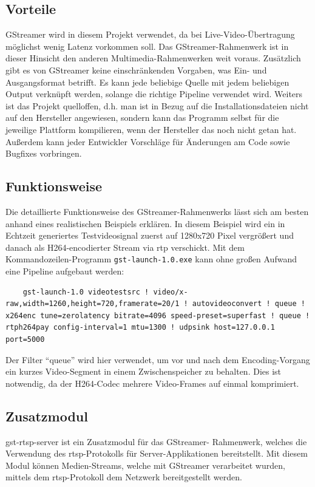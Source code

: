 \subsection{Vorteile}
GStreamer wird in diesem Projekt verwendet, da bei Live-Video-Übertragung möglichst wenig Latenz vorkommen soll.
Das GStreamer-Rahmenwerk ist in dieser Hinsicht den anderen Multimedia-Rahmenwerken weit voraus.
Zusätzlich gibt es von GStreamer keine einschränkenden Vorgaben, was Ein- und Ausgangsformat betrifft.
Es kann jede beliebige Quelle mit jedem beliebigen Output verknüpft werden, solange die richtige Pipeline verwendet wird.
Weiters ist das Projekt quelloffen, d.h. man ist in Bezug auf die Installationsdateien nicht auf den Hersteller angewiesen, sondern kann das Programm selbst für die jeweilige Plattform kompilieren, wenn der Hersteller das noch nicht getan hat.
Außerdem kann jeder Entwickler Vorschläge für Änderungen am Code sowie Bugfixes vorbringen.
\subsection{Funktionsweise}
Die detaillierte Funktionsweise des GStreamer-Rahmenwerks lässt sich am besten anhand eines realistischen Beispiels erklären.
In diesem Beispiel wird ein in Echtzeit generiertes Testvideosignal zuerst auf 1280x720 Pixel vergrößert und danach als H264-encodierter Stream via \ac{rtp} verschickt.
Mit dem Kommandozeilen-Programm \texttt{gst-launch-1.0.exe} kann ohne großen Aufwand eine Pipeline aufgebaut werden:
\begin{verbatim}
    gst-launch-1.0 videotestsrc ! video/x-raw,width=1260,height=720,framerate=20/1 ! autovideoconvert ! queue ! x264enc tune=zerolatency bitrate=4096 speed-preset=superfast ! queue ! rtph264pay config-interval=1 mtu=1300 ! udpsink host=127.0.0.1 port=5000
\end{verbatim}
Der Filter \enquote{queue} wird hier verwendet, um vor und nach dem Encoding-Vorgang ein kurzes Video-Segment in einem Zwischenspeicher zu behalten. Dies ist notwendig, da der H264-Codec mehrere Video-Frames auf einmal komprimiert.

\subsection{Zusatzmodul}
gst-rtsp-server ist ein Zusatzmodul für das GStreamer- Rahmenwerk, welches die Verwendung des \ac{rtsp}-Protokolls für Server-Applikationen bereitstellt.
Mit diesem Modul können Medien-Streams, welche mit GStreamer verarbeitet wurden, mittels dem \ac{rtsp}-Protokoll dem Netzwerk bereitgestellt werden.

